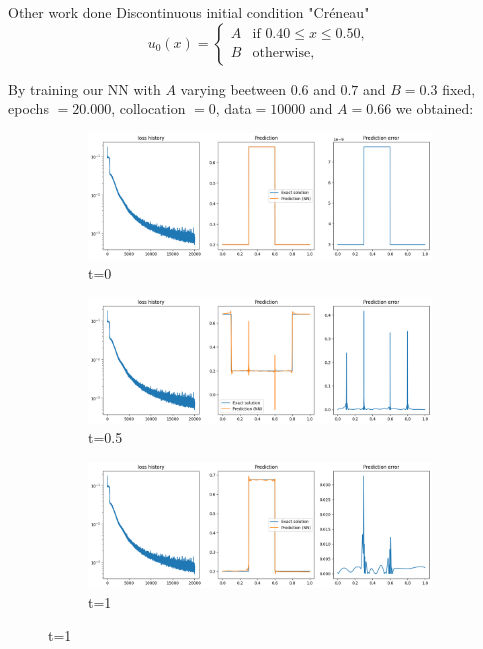 \begin{frame}{Other work done}
    Discontinuous initial condition "Créneau" 
    \begin{equation}
        u_0(x) = \begin{cases}
            A & \text{if } 0.40 \leq x \leq 0.50, \\
            B & \text{otherwise},
        \end{cases}
    \end{equation}

    By training our NN with $A$ varying beetween $0.6$ and $0.7$ and $B=0.3$ fixed, 
    epochs $= 20.000$, collocation $= 0$, data$=10000$ and $A=0.66$ we obtained:

    
    \begin{figure}
        \centering
        
        \begin{subfigure}{0.32\textwidth}
            \centering
            \includegraphics[width=\textwidth]{images/c1.png}
            \caption{t=0}
        \end{subfigure}
        \begin{subfigure}{0.32\textwidth}
            \centering
            \includegraphics[width=\textwidth]{images/c2.png}
            \caption{t=0.5}
        \end{subfigure}
        \begin{subfigure}{0.32\textwidth}
            \centering
            \includegraphics[width=\textwidth]{images/c3.png}
            \caption{t=1}
        \end{subfigure}
    \end{figure}


\end{frame}

